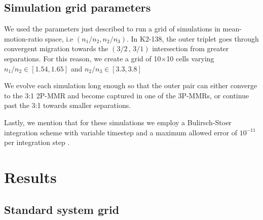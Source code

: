 \documentclass[baaa]{baaa}
\begin{document}
\subsection{Simulation grid parameters}

We used the parameters just described to run a grid of simulations in mean-motion-ratio space, i.e $(n_1/n_2 , n_2/n_3)$.
In K2-138, the outer triplet goes through convergent migration towards the $(3/2\,,\,3/1)$ intersection from greater separations.
For this reason, we create a grid of 10$\times$10 cells varying $n_1/n_2\in[1.54,1.65]$ and $n_2/n_3\in[3.3,3.8]$


We evolve each simulation long enough so that the outer pair can either converge to the 3:1 2P-MMR and become captured in one of the 3P-MMRs, or continue past the 3:1 towards smaller separations.


Lastly, we mention that for these simulations we employ a Bulirsch-Stoer integration scheme with variable timestep and a maximum allowed error of $10^{-11}$ per integration step \citep{Bulirsch1966}.


\section{Results}

\subsection{Standard system grid}
\label{subsec:result:estandar}
\end{document}
